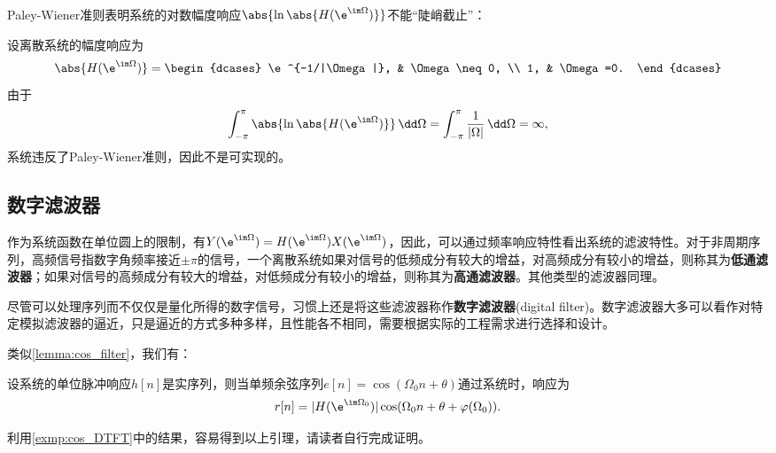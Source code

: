 Paley-Wiener准则表明系统的对数幅度响应$\abs{\ln\abs{H(\e^{\im\Omega})}}$不能“陡峭截止”：
\begin{example}
    设离散系统的幅度响应为
    \begin{equation}
        \abs{H(\e^{\im\Omega})}=\begin{dcases}
            \e^{-1/|\Omega|}, & \Omega\neq 0, \\
            1,                & \Omega=0.
        \end{dcases}
    \end{equation}
    由于
    \begin{equation}
        \int_{-\pi}^{\pi}\abs{\ln\abs{H(\e^{\im\Omega})}}\,\dd\Omega=\int_{-\pi}^{\pi}\frac{1}{|\Omega|}\,\dd\Omega=\infty,
    \end{equation}
    系统违反了Paley-Wiener准则，因此不是可实现的。
\end{example}

\subsection{数字滤波器}\label{sub:diital_filter}

作为系统函数在单位圆上的限制，有$Y(\e^{\im\Omega})=H(\e^{\im\Omega})X(\e^{\im\Omega})$，因此，可以通过频率响应特性看出系统的滤波特性。对于非周期序列，高频信号指数字角频率接近$\pm\pi$的信号，一个离散系统如果对信号的低频成分有较大的增益，对高频成分有较小的增益，则称其为\textbf{低通滤波器}；如果对信号的高频成分有较大的增益，对低频成分有较小的增益，则称其为\textbf{高通滤波器}。其他类型的滤波器同理。

尽管可以处理序列而不仅仅是量化所得的数字信号，习惯上还是将这些滤波器称作\textbf{数字滤波器}(digital filter)。数字滤波器大多可以看作对特定模拟滤波器的逼近，只是逼近的方式多种多样，且性能各不相同，需要根据实际的工程需求进行选择和设计。

类似\cref{lemma:cos_filter}，我们有：
\begin{lemma}\label{lemma:digital_cos_filter}
    设系统的单位脉冲响应$h[n]$是实序列，则当单频余弦序列$e[n]=\cos(\Omega_0 n+\theta)$通过系统时，响应为
    \begin{equation}
        r[n]=|H(\e^{\im\Omega_0})|\cos(\Omega_0 n+\theta+\varphi(\Omega_0)).
    \end{equation}
\end{lemma}
利用\cref{exmp:cos_DTFT}中的结果，容易得到以上引理，请读者自行完成证明。

